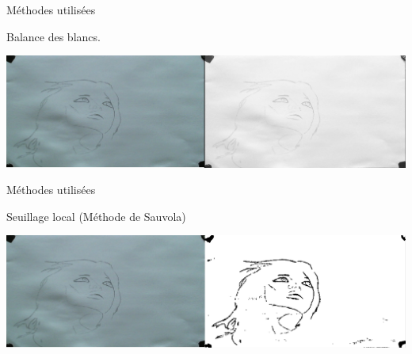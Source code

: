 \documentclass[t,14pt]{beamer}
\begin{document}
\begin{frame}{Méthodes utilisées}
\vspace{5mm}
\begin{block}{}
Balance des blancs.
\end{block}
\begin{center}
\includegraphics[width=\textwidth]{images/wb.png}
\end{center}
\end{frame}
\begin{frame}{Méthodes utilisées}
\vspace{5mm}
\begin{block}{}
Seuillage local (Méthode de Sauvola) 
\end{block}
\begin{center}
\includegraphics[width=\textwidth]{images/sauvola.png}
\end{center}
\end{frame}

%
%
%
\end{document}
